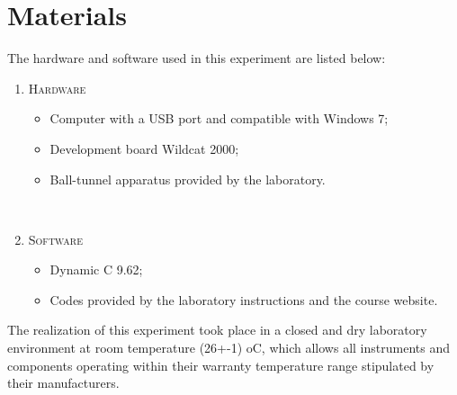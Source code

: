 \section{Materials}

The hardware and software used in this experiment are listed below:

\begin{enumerate}[]
\item \textsc{Hardware} \hfill
\begin{itemize}
\item Computer with a USB port and compatible with Windows 7;
\item Development board Wildcat 2000;
\item Ball-tunnel apparatus provided by the laboratory.
\end{itemize}
\\
\item \textsc{Software}  \hfill
\begin{itemize}
\item Dynamic C 9.62;
\item Codes provided by the laboratory instructions and the course website.
\end{itemize}
\end{enumerate}

The realization of this experiment took place in a closed and dry laboratory environment at room temperature (26+-1)  oC, which allows all instruments and components operating within their warranty temperature range stipulated by their manufacturers.

